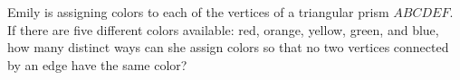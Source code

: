 Emily is assigning colors to each of the vertices of a triangular prism $ABCDEF$. If there are five different colors available: red, orange, yellow, green, and blue, how many distinct ways can she assign colors so that no two vertices connected by an edge have the same color?
